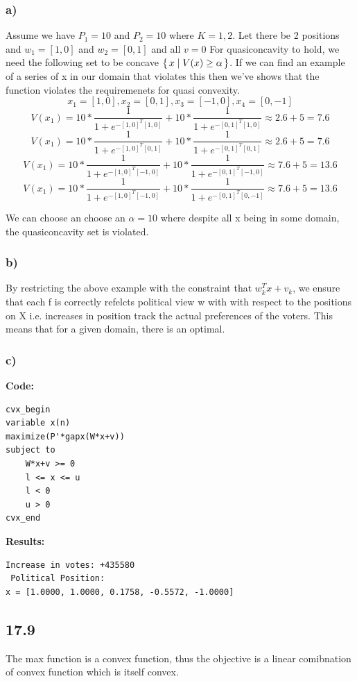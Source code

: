 \documentclass[12pt]{article}
\begin{document}
\subsubsection*{a)}
Assume we have $P_1 = 10$ and $P_2 = 10$ where $K = 1,2$. Let there be 2 positions and $w_1 = [1,0]$ and $w_2 = [0,1]$ and all $v=0$ For quasiconcavity to hold, we need the following set to be concave $\set{x|V(x) \ge \alpha}$. If we can find an example of a series of x in our domain that violates this then we've shows that the function violates the requiremenets for quasi convexity.
$$x_1 = [1,0], x_2=[0,1], x_3=[-1,0], x_4=[0,-1]$$
$$V(x_1) = 10*\frac{1}{1+e^{-[1,0]^T[1,0]}} + 10*\frac{1}{1+e^{-[0,1]^T[1,0]}} \approx 2.6 + 5 = 7.6$$
$$V(x_1) = 10*\frac{1}{1+e^{-[1,0]^T[0,1]}} + 10*\frac{1}{1+e^{-[0,1]^T[0,1]}}  \approx  2.6 + 5 = 7.6$$ 
$$V(x_1) = 10*\frac{1}{1+e^{-[1,0]^T[-1,0]}} + 10*\frac{1}{1+e^{-[0,1]^T[-1,0]}}  \approx  7.6 + 5 = 13.6$$ 
$$V(x_1) = 10*\frac{1}{1+e^{-[1,0]^T[-1,0]}} + 10*\frac{1}{1+e^{-[0,1]^T[0,-1]}}  \approx  7.6 + 5 = 13.6$$ 

We can choose an choose an $\alpha = 10$ where despite all x being in some domain, the quasiconcavity set is violated.

\subsubsection*{b)}
By restricting the above example with the constraint that $w_k^Tx + v_k$, we ensure that each f is correctly refelcts political view w with with respect to the positions on X i.e. increases in position track the actual preferences of the voters. This means that for a given domain, there is an optimal.

\subsubsection*{c)}
\textbf{Code:}\\
\begin{lstlisting}
cvx_begin
variable x(n)
maximize(P'*gapx(W*x+v))
subject to
    W*x+v >= 0
    l <= x <= u
    l < 0
    u > 0
cvx_end
\end{lstlisting}
\textbf{Results:}
\begin{verbatim}
Increase in votes: +435580
 Political Position:
x = [1.0000, 1.0000, 0.1758, -0.5572, -1.0000]
\end{verbatim}

\subsection*{17.9}
The max function is a convex function, thus the objective is a linear comibnation of convex function which is itself convex.
\end{document}

